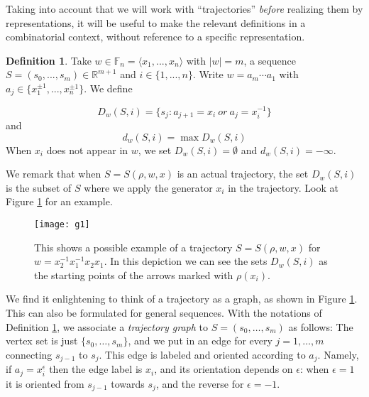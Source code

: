 \documentclass[12pt]{article}
\newcommand{\F}{\mathbb{F}}
\newcommand{\R}{\mathbb{R}}
\theoremstyle{definition}
\newtheorem{defi}[thm]{Definition}
\begin{document}
Taking into account that we will work with ``trajectories'' {\em before} realizing them by representations, it will be useful to make the relevant definitions in a combinatorial context, without reference to a specific representation.   

\begin{defi}\label{trajectory} Take $w\in\F_n=\langle x_1,...,x_n\rangle$ with $|w|=m$, a sequence $S=(s_0,...,s_m)\in\R^{m+1}$ and $i\in\{1,...,n\}$. Write $w=a_m \cdots a_1$ with $a_j\in\{x_1^{\pm 1},...,x_n^{\pm 1}\}$. We define

$$D_w(S,i)=\{s_j:a_{j+1}=x_i \ or \ a_{j}=x_i^{-1}\}$$
and
$$d_w(S,i) = \max D_w(S,i)$$ 
When $x_i$ does not appear in $w$, we set $D_w(S,i)=\emptyset$ and $d_w(S,i)=-\infty$. 
  
\end{defi}

We remark that when $S=S(\rho,w,x)$ is an actual trajectory, the set $D_w(S,i)$ is the subset of $S$ where we apply the generator $x_i$ in the trajectory. Look at Figure \ref{f1} for an example. 











\begin{figure}[h!] 
\centering
\texttt{[image: g1]}
\caption{This shows a possible example of a trajectory $S=S(\rho,w,x)$ for $w=x_2^{-1}x_1^{-1}x_2x_1$. In this depiction we can see the sets $D_w(S,i)$ as the starting points of the arrows marked with $\rho(x_i)$.}
\label{f1}
\end{figure}

We find it enlightening to think of a trajectory as a graph, as shown in Figure \ref{f1}. This can also be formulated for general sequences. With the notations of Definition \ref{trajectory}, we associate a {\em trajectory graph} to $S=(s_0,\ldots,s_m)$ as follows: The vertex set is just $\{s_0,\ldots,s_m\}$, and we put in an edge for every $j=1,\dots,m$ connecting $s_{j-1}$ to $s_j$. This edge is labeled and oriented according to $a_j$. Namely, if $a_j=x_{i}^{\epsilon}$ then the edge label is $x_i$, and its orientation depends on $\epsilon$: when $\epsilon=1$ it is oriented from $s_{j-1}$ towards $s_j$, and the reverse for $\epsilon=-1$.
\end{document}
